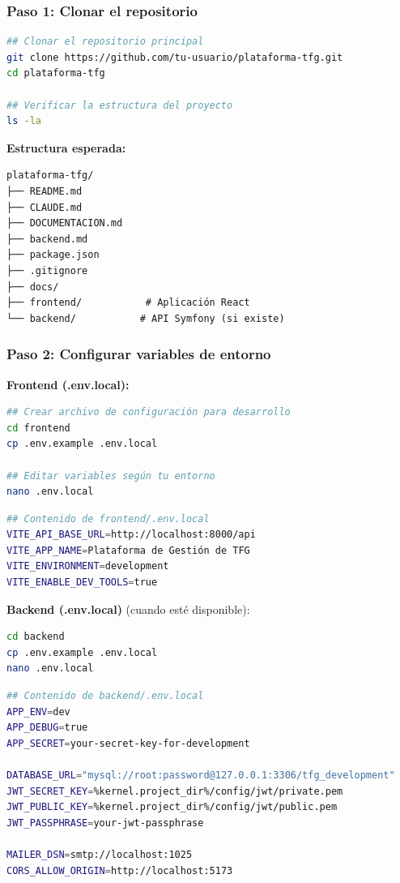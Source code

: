 \documentclass[12pt,a4paper,oneside]{report}
\begin{document}
\subsubsection{Paso 1: Clonar el
repositorio}\label{paso-1-clonar-el-repositorio}

\begin{lstlisting}[language=bash]
## Clonar el repositorio principal
git clone https://github.com/tu-usuario/plataforma-tfg.git
cd plataforma-tfg

## Verificar la estructura del proyecto
ls -la
\end{lstlisting}

\textbf{Estructura esperada:}

\begin{lstlisting}
plataforma-tfg/
├── README.md
├── CLAUDE.md
├── DOCUMENTACION.md
├── backend.md
├── package.json
├── .gitignore
├── docs/
├── frontend/           # Aplicación React
└── backend/           # API Symfony (si existe)
\end{lstlisting}

\subsubsection{Paso 2: Configurar variables de
entorno}\label{paso-2-configurar-variables-de-entorno}

\textbf{Frontend (.env.local):}

\begin{lstlisting}[language=bash]
## Crear archivo de configuración para desarrollo
cd frontend
cp .env.example .env.local

## Editar variables según tu entorno
nano .env.local
\end{lstlisting}

\begin{lstlisting}[language=bash]
## Contenido de frontend/.env.local
VITE_API_BASE_URL=http://localhost:8000/api
VITE_APP_NAME=Plataforma de Gestión de TFG
VITE_ENVIRONMENT=development
VITE_ENABLE_DEV_TOOLS=true
\end{lstlisting}

\textbf{Backend (.env.local)} (cuando esté disponible):

\begin{lstlisting}[language=bash]
cd backend
cp .env.example .env.local
nano .env.local
\end{lstlisting}

\begin{lstlisting}[language=bash]
## Contenido de backend/.env.local
APP_ENV=dev
APP_DEBUG=true
APP_SECRET=your-secret-key-for-development

DATABASE_URL="mysql://root:password@127.0.0.1:3306/tfg_development"
JWT_SECRET_KEY=%kernel.project_dir%/config/jwt/private.pem
JWT_PUBLIC_KEY=%kernel.project_dir%/config/jwt/public.pem
JWT_PASSPHRASE=your-jwt-passphrase

MAILER_DSN=smtp://localhost:1025
CORS_ALLOW_ORIGIN=http://localhost:5173
\end{lstlisting}
\end{document}
